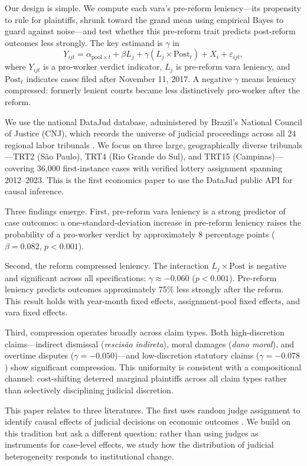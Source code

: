 \documentclass[12pt]{article}
\begin{document}
Our design is simple. We compute each vara's pre-reform leniency---its propensity to rule for plaintiffs, shrunk toward the grand mean using empirical Bayes to guard against noise---and test whether this pre-reform trait predicts post-reform outcomes less strongly. The key estimand is $\gamma$ in
\[
Y_{ijt} = \alpha_{\text{pool} \times t} + \beta L_j + \gamma (L_j \times \text{Post}_t) + X_i + \varepsilon_{ijt},
\]
where $Y_{ijt}$ is a pro-worker verdict indicator, $L_j$ is pre-reform vara leniency, and $\text{Post}_t$ indicates cases filed after November 11, 2017. A negative $\gamma$ means leniency compressed: formerly lenient courts became less distinctively pro-worker after the reform.

We use the national DataJud database, administered by Brazil's National Council of Justice (CNJ), which records the universe of judicial proceedings across all 24 regional labor tribunals \citep{araujo2023datajud}. We focus on three large, geographically diverse tribunals---TRT2 (S\~{a}o Paulo), TRT4 (Rio Grande do Sul), and TRT15 (Campinas)---covering 36,000 first-instance cases with verified lottery assignment spanning 2012--2023. This is the first economics paper to use the DataJud public API for causal inference.

Three findings emerge. First, pre-reform vara leniency is a strong predictor of case outcomes: a one-standard-deviation increase in pre-reform leniency raises the probability of a pro-worker verdict by approximately 8 percentage points ($\beta = 0.082$, $p < 0.001$).

Second, the reform compressed leniency. The interaction $L_j \times \text{Post}$ is negative and significant across all specifications: $\gamma \approx -0.060$ ($p < 0.001$). Pre-reform leniency predicts outcomes approximately 75\% less strongly after the reform. This result holds with year-month fixed effects, assignment-pool fixed effects, and vara fixed effects.

Third, compression operates broadly across claim types. Both high-discretion claims---indirect dismissal (\textit{rescis\~{a}o indireta}), moral damages (\textit{dano moral}), and overtime disputes ($\gamma = -0.050$)---and low-discretion statutory claims ($\gamma = -0.078$) show significant compression. This uniformity is consistent with a compositional channel: cost-shifting deterred marginal plaintiffs across all claim types rather than selectively disciplining judicial discretion.

This paper relates to three literatures. The first uses random judge assignment to identify causal effects of judicial decisions on economic outcomes \citep{kling2006, dobbiesong2015, dobbiegoldinyang2018, frandsen2023}. We build on this tradition but ask a different question: rather than using judges as instruments for case-level effects, we study how the distribution of judicial heterogeneity responds to institutional change.
\end{document}
